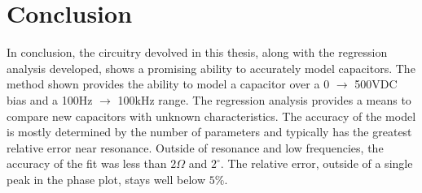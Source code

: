 \section {Conclusion}

In conclusion, the circuitry devolved in this thesis, along with the regression analysis developed, shows a promising ability to accurately model capacitors. The method shown provides the ability to model a capacitor over a 0 $\rightarrow$ 500VDC bias and a 100Hz $\rightarrow$ 100kHz range. The regression analysis provides a means to compare new capacitors with unknown characteristics. The accuracy of the model is mostly determined by the number of parameters and typically has the greatest relative error near resonance. Outside of resonance and low frequencies, the accuracy of the fit was less than $2 \Omega$ and $2^{\circ}$. The relative error, outside of a single peak in the phase plot, stays well below $5\%$.

